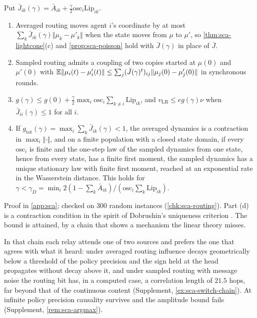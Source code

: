 \begin{proposition}\label{prop:sca-routing}
Put $\bar J_{ik}(\gamma)=\bar A_{ik}+\tfrac{\gamma}{2}\mathrm{osc}_i\mathrm{Lip}_{ik}$.
\begin{enumerate}
\item[(a)] Averaged routing moves agent $i$'s coordinate by at most $\sum_k\bar J_{ik}(\gamma)\Vert\mu_k-\mu'_k\Vert$ when the state moves from $\mu$ to $\mu'$, so \cref{thm:sca-lightcone}(c) and \cref{prop:sca-poisson} hold with $\bar J(\gamma)$ in place of $\bar J$.
\item[(b)] Sampled routing admits a coupling of two copies started at $\mu(0)$ and $\mu'(0)$ with $\mathbb{E}\Vert\mu_i(t)-\mu'_i(t)\Vert\le\sum_j(\bar J(\gamma)^t)_{ij}\Vert\mu_j(0)-\mu'_j(0)\Vert$ in synchronous rounds.
\item[(c)] $g(\gamma)\le g(0)+\frac{\gamma}{2}\max_i\mathrm{osc}_i\sum_{k\neq i}\mathrm{Lip}_{ik}$, and $v_{\mathrm{LR}}\le eg(\gamma)\nu$ when $\bar J_{ii}(\gamma)\le1$ for all $i$.
\item[(d)] If $g_{\mathrm{tot}}(\gamma)=\max_i\sum_k\bar J_{ik}(\gamma)<1$, the averaged dynamics is a contraction in $\max_i\Vert\cdot\Vert$, and on a finite population with a closed state domain, if every $\mathrm{osc}_i$ is finite and the one-step law of the sampled dynamics from one state, hence from every state, has a finite first moment, the sampled dynamics has a unique stationary law with finite first moment, reached at an exponential rate in the Wasserstein distance. This holds for $\gamma<\gamma_D=\min_i2(1-\sum_k\bar A_{ik})/(\mathrm{osc}_i\sum_k\mathrm{Lip}_{ik})$.
\end{enumerate}
\end{proposition}
Proof in \cref{app:sca}; checked on 300 random instances (\cref{chk:sca-routing}). Part (d) is a contraction condition in the spirit of Dobrushin's uniqueness criterion \citep{dobrushin1968description}. The bound is attained, by a chain that shows a mechanism the linear theory misses.

In that chain each relay attends one of two sources and prefers the one that agrees with what it heard: under averaged routing influence decays geometrically below a threshold of the policy precision and the sign held at the head propagates without decay above it, and under sampled routing with message noise the routing bit has, in a computed case, a correlation length of $21.5$ hops, far beyond that of the continuous content (Supplement, \cref{ex:sca-switch-chain}). At infinite policy precision causality survives and the amplitude bound fails (Supplement, \cref{rem:sca-argmax}).

